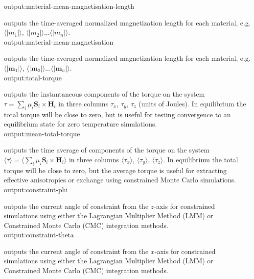 {\zicf output:material-mean-magnetisation-length} outputs the time-averaged normalized magnetization length for each material, e.g. $\langle|m_1|\rangle$, $\langle|m_2|\rangle$...$\langle|m_n|\rangle$.\\

{\zicf output:material-mean-magnetisation} outputs the time-averaged normalized magnetization length for each material, e.g. $\langle|\mathbf{m}_1|\rangle$, $\langle|\mathbf{m}_2|\rangle$...$\langle|\mathbf{m}_n|\rangle$.\\

{\zicf output:total-torque} outputs the instantaneous components of the torque on the system $\tau = \sum_i \mu_i \mathbf{S}_i \times \mathbf{H}_i$ in three columns $\tau_x$, $\tau_y$, $\tau_z$ (units of Joules). In equilibrium the total torque will be close to zero, but is useful for testing convergence to an equilibrium state for zero temperature simulations.\\

{\zicf output:mean-total-torque} outputs the time average of components of the torque on the system $\langle\tau\rangle = \langle\sum_i \mu_i \mathbf{S}_i \times \mathbf{H}_i \rangle$ in three columns $\langle\tau_x \rangle$, $\langle\tau_y \rangle$, $\langle\tau_z \rangle$. In equilibrium the total torque will be close to zero, but the average torque is useful for extracting effective anisotropies or exchange using constrained Monte Carlo simulations.\\

{\zicf output:constraint-phi} outputs the current angle of constraint from the $z$-axis for constrained simulations using either the Lagrangian Multiplier Method (LMM) or Constrained Monte Carlo (CMC) integration methods.\\

{\zicf output:constraint-theta} outputs the current angle of constraint from the $x$-axis for constrained simulations using either the Lagrangian Multiplier Method (LMM) or Constrained Monte Carlo (CMC) integration methods.\\


